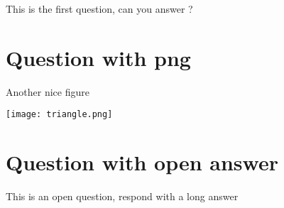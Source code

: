 \documentclass[a4paper,11pt,twoside]{article}
\begin{document}
This is the first question, can you answer ?



\section*{Question with png}
\label{sec:orgcbbb88a}

Another nice figure

\begin{center}
\texttt{[image: triangle.png]}
\end{center}



\section*{Question with open answer}
\label{sec:orgd22e1b3}

This is an open question, respond with a long answer


\subsection*{}
\label{sec:org2a5e384}

\cleardoublepage
\end{document}
